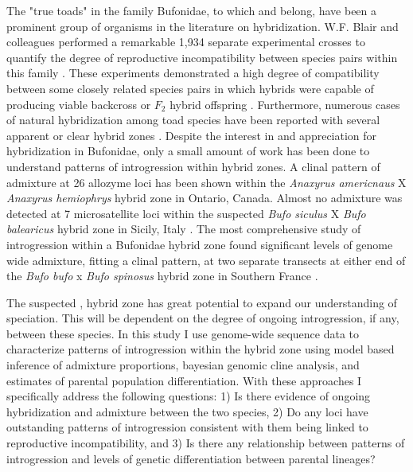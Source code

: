 The "true toads" in the family Bufonidae, to which \amer and \terr belong,  
have been a prominent group of organisms in the literature on hybridization. 
W.F. Blair and colleagues performed a remarkable 1,934 separate experimental crosses 
to quantify the degree of reproductive incompatibility between species pairs within
this family \parencite{blair1972,malone2008}.
These experiments demonstrated a high degree of compatibility between some closely 
related species pairs in which hybrids were capable of producing viable backcross 
or $F_2$ hybrid offspring \parencite{blair1963}.
Furthermore, numerous cases of natural hybridization among toad species have been 
reported with several apparent or clear hybrid zones 
\parencite{green1996,vanriemsdijk2023,colliard2010,weatherby1982}.
Despite the interest in and appreciation for hybridization in Bufonidae, only a 
small amount of work has been done to understand patterns of introgression
within hybrid zones. 
A clinal pattern of admixture at 26 allozyme loci has been shown within the 
\textit{Anaxyrus americnaus} X \textit{Anaxyrus hemiophrys} hybrid zone in 
Ontario, Canada\parencite{green1983}.
Almost no admixture was detected at 7 microsatellite loci within the suspected \textit{Bufo siculus} X 
\textit{Bufo balearicus} hybrid zone in Sicily, Italy \parencite{colliard2010}.
The most comprehensive study of introgression within a Bufonidae hybrid zone found 
significant levels of genome wide admixture, fitting a clinal pattern, at two separate transects 
at either end of the \textit{Bufo bufo} x \textit{Bufo spinosus} hybrid zone
in Southern France \parencite{vanriemsdijk2023}.

The suspected \amer, \terr hybrid zone has great potential to expand our 
understanding of speciation. 
This will be dependent on the degree of ongoing introgression, if any, between 
these species.
In this study I use genome-wide sequence data to characterize patterns of  
introgression within the hybrid zone using model based inference of admixture
proportions, bayesian genomic cline analysis, and estimates of parental population differentiation.
With these approaches I specifically address the following questions: 
1) Is there evidence of ongoing hybridization and admixture between the two species,
2) Do any loci have outstanding patterns of introgression consistent with them
being linked to reproductive incompatibility, and
3) Is there any relationship between patterns of introgression and levels 
of genetic differentiation between parental lineages?


